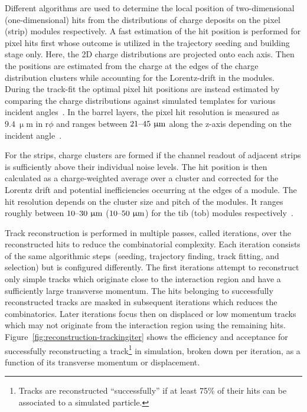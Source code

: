 Different algorithms are used to determine the local position of two-dimensional (one-dimensional) hits from the distributions of charge deposits on the pixel (strip) modules respectively. A fast estimation of the hit position is performed for pixel hits first whose outcome is utilized in the trajectory seeding and building stage only. Here, the 2D charge distributions are projected onto each axis. Then the positions are estimated from the charge at the edges of the charge distribution clusters while accounting for the Lorentz-drift in the modules. During the track-fit the optimal pixel hit positions are instead estimated by comparing the charge distributions against simulated templates for various incident angles~\cite{Swartz:2007zz}. In the barrel layers, the pixel hit resolution is measured as $9.4~\upmu\mathrm{m}$ in $\mathrm{r}\phi$ and ranges between $21\text{--}45~\upmu\mathrm{m}$ along the z-axis depending on the incident angle~\cite{Chatrchyan:2014fea}. 

For the strips, charge clusters are formed if the channel readout of adjacent strips is sufficiently above their individual noise levels. The hit position is then calculated as a charge-weighted average over a cluster and corrected for the Lorentz drift and potential inefficiencies occurring at the edges of a module. The hit resolution depends on the cluster size and pitch of the modules. It ranges roughly between $10\text{--}30~\upmu\mathrm{m}$ ($10\text{--}50~\upmu\mathrm{m}$) for the \gls{tib} (\gls{tob}) modules respectively~\cite{Chatrchyan:2014fea}.

Track reconstruction is performed in multiple passes, called iterations, over the reconstructed hits to reduce the combinatorial complexity. Each iteration consists of the same algorithmic steps~(seeding, trajectory finding, track fitting, and selection) but is configured differently. The first iterations attempt to reconstruct only simple tracks which originate close to the interaction region and have a sufficiently large transverse momentum. The hits belonging to successfully reconstructed tracks are masked in subsequent iterations which reduces the combinatorics. Later iterations focus then on displaced or low momentum tracks which may not originate from the interaction region using the remaining hits. Figure~\ref{fig:reconstruction-trackingiter} shows the efficiency and acceptance for successfully reconstructing a track\footnote{Tracks are reconstructed ``successfully'' if at least 75\% of their hits can be associated to a simulated particle.} in simulation, broken down per iteration, as a function of its transverse momentum or displacement.

